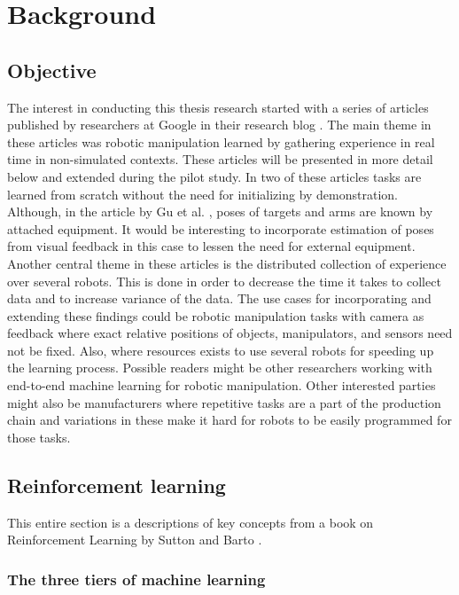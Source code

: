 \section{Background}

\subsection{Objective}

The interest in conducting this thesis research started with a series of
articles published by researchers at Google in their research blog
\cite{gu2016deep,finn2016deep,yahya2016collective,chebotar2016path}. The main
theme in these articles was robotic manipulation learned by gathering
experience in real time in non-simulated contexts. These articles will be
presented in more detail below and extended during the pilot study. In two of
these articles \cite{gu2016deep,finn2016deep} tasks are learned from scratch
without the need for initializing by demonstration. Although, in the article by
Gu et al. \cite{gu2016deep}, poses of targets and arms are known by attached
equipment. It would be interesting to incorporate estimation of poses from
visual feedback in this case to lessen the need for external equipment. Another
central theme in these articles is the distributed collection of experience
over several robots. This is done in order to decrease the time it takes to
collect data and to increase variance of the data. The use cases for
incorporating and extending these findings could be robotic manipulation tasks
with camera as feedback where exact relative positions of objects,
manipulators, and sensors need not be fixed. Also, where resources exists to
use several robots for speeding up the learning process. Possible readers might
be other researchers working with end-to-end machine learning for robotic
manipulation. Other interested parties might also be manufacturers where
repetitive tasks are a part of the production chain and variations in these
make it hard for robots to be easily programmed for those tasks.

\subsection{Reinforcement learning}

This entire section is a descriptions of key concepts from a book on
Reinforcement Learning by Sutton and Barto \cite{sutton1998reinforcement}.

\subsubsection{The three tiers of machine learning}

